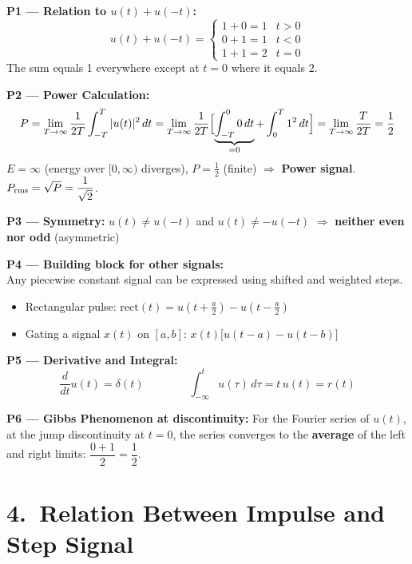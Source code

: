\documentclass[10pt,a4paper]{article}
\newcommand{\Intt}{\displaystyle\int_{-\infty}^{t}}
\begin{document}
\begin{propbox}
\textbf{P1 --- Relation to $u(t)+u(-t)$:}
\[
  u(t)+u(-t)=\begin{cases}1+0=1 & t>0 \\ 0+1=1 & t<0 \\ 1+1=2 & t=0\end{cases}
\]
The sum equals 1 everywhere except at $t=0$ where it equals 2.

\medskip
\textbf{P2 --- Power Calculation:}
\[
  P = \lim_{T\to\infty}\frac{1}{2T}\int_{-T}^{T}|u(t)|^2\,dt
    = \lim_{T\to\infty}\frac{1}{2T}\Bigl[\underbrace{\int_{-T}^{0}0\,dt}_{=0}+\int_{0}^{T}1^2\,dt\Bigr]
    = \lim_{T\to\infty}\frac{T}{2T} = \frac{1}{2}
\]
$E = \infty$ (energy over $[0,\infty)$ diverges), $P = \tfrac{1}{2}$ (finite) $\Rightarrow$ \textbf{Power signal}. \quad $P_{\rm rms} = \sqrt{P} = \dfrac{1}{\sqrt{2}}$.

\medskip
\textbf{P3 --- Symmetry:}
$u(t) \neq u(-t)$ and $u(t) \neq -u(-t)$ $\Rightarrow$ \textbf{neither even nor odd} (asymmetric)

\medskip
\textbf{P4 --- Building block for other signals:}\\
Any piecewise constant signal can be expressed using shifted and weighted steps.
\begin{itemize}
  \item Rectangular pulse: $\mathrm{rect}(t) = u(t+\tfrac{a}{2}) - u(t-\tfrac{a}{2})$
  \item Gating a signal $x(t)$ on $[a,b]$: $x(t)\bigl[u(t-a)-u(t-b)\bigr]$
\end{itemize}

\medskip
\textbf{P5 --- Derivative and Integral:}
\[
  \frac{d}{dt}u(t) = \delta(t) \qquad\qquad \Intt u(\tau)\,d\tau = t\,u(t) = r(t)
\]

\medskip
\textbf{P6 --- Gibbs Phenomenon at discontinuity:}
For the Fourier series of $u(t)$, at the jump discontinuity at $t=0$, the series converges to the \textbf{average} of the left and right limits: $\dfrac{0+1}{2}=\dfrac{1}{2}$.
\end{propbox}

\section{4.\ Relation Between Impulse and Step Signal}
\end{document}
